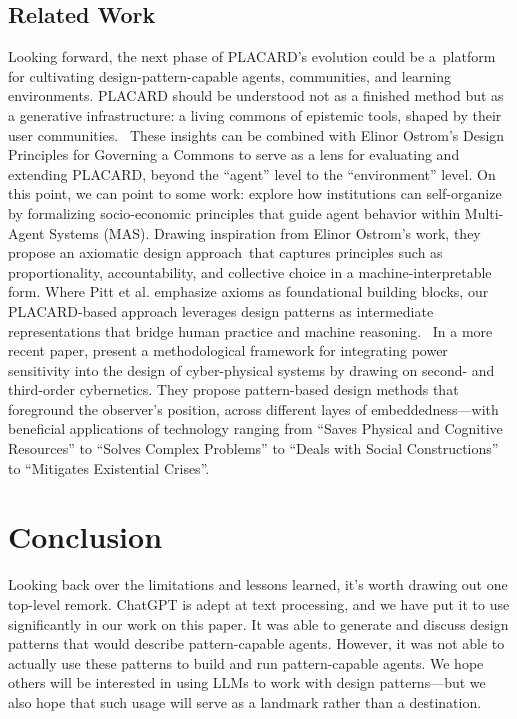 \documentclass[acmlarge,timestamp]{acmart}
\begin{document}
{\subsection{Related Work}
Looking forward, the next phase of PLACARD's evolution could be
a~platform for cultivating design-pattern-capable agents, communities,
and learning environments. PLACARD should be understood not as a
finished method but as a generative infrastructure: a living commons
of epistemic tools, shaped by their user communities. ~These insights
can be combined with Elinor Ostrom's Design Principles for Governing a
Commons to serve as a lens for evaluating and extending PLACARD,
beyond the ``agent'' level to the ``environment'' level. On this
point, we can point to some work: \citet{10.1145/2382570.2382575}
explore how institutions can self-organize by formalizing
socio-economic principles that guide agent behavior within Multi-Agent
Systems (MAS).  Drawing inspiration from Elinor Ostrom's work, they
propose an axiomatic design approach~that captures principles such as
proportionality, accountability, and collective choice in a
machine-interpretable form. Where Pitt et al. emphasize axioms as
foundational building blocks, our PLACARD-based approach leverages
design patterns as intermediate representations that bridge human
practice and machine reasoning. ~In a more recent paper,
\citet{10.1162/isal_a_00800} present a methodological framework for
integrating power sensitivity into the design of cyber-physical
systems by drawing on second- and third-order cybernetics. They
propose pattern-based design methods that foreground the observer's
position, across different layes of embeddedness---with beneficial
applications of technology ranging from ``Saves Physical and Cognitive
Resources'' to ``Solves Complex Problems'' to ``Deals with Social
Constructions'' to ``Mitigates Existential Crises''.

\section{Conclusion}\label{sec:conclusion}

Looking back over the limitations and lessons learned, it’s worth
drawing out one top-level remork.  ChatGPT is adept at text
processing, and we have put it to use significantly in our work on
this paper.  It was able to generate and discuss design patterns that
would describe pattern-capable agents.  However, it was not able to
actually use these patterns to build and run pattern-capable agents.
We hope others will be interested in using LLMs to work with design
patterns—but we also hope that such usage will serve as a landmark
rather than a destination.

}
\end{document}

